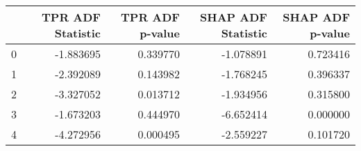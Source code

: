 \begin{tabular}{lrrrr}
\toprule
 & TPR ADF Statistic & TPR ADF p-value & SHAP ADF Statistic & SHAP ADF p-value \\
\midrule
0 & -1.883695 & 0.339770 & -1.078891 & 0.723416 \\
1 & -2.392089 & 0.143982 & -1.768245 & 0.396337 \\
2 & -3.327052 & 0.013712 & -1.934956 & 0.315800 \\
3 & -1.673203 & 0.444970 & -6.652414 & 0.000000 \\
4 & -4.272956 & 0.000495 & -2.559227 & 0.101720 \\
\bottomrule
\end{tabular}
